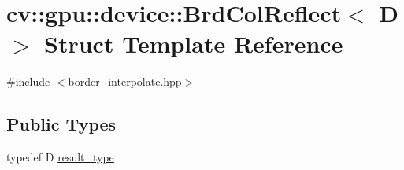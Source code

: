 \hypertarget{structcv_1_1gpu_1_1device_1_1BrdColReflect}{\section{cv\-:\-:gpu\-:\-:device\-:\-:Brd\-Col\-Reflect$<$ D $>$ Struct Template Reference}
\label{structcv_1_1gpu_1_1device_1_1BrdColReflect}
}


{\ttfamily \#include $<$border\-\_\-interpolate.\-hpp$>$}

\subsection*{Public Types}
\begin{DoxyCompactItemize}
\item 
typedef D \hyperlink{structcv_1_1gpu_1_1device_1_1BrdColReflect_af00d6bbdebcae365b6c9020375b99fe5}{result\-\_\-type}
\end{DoxyCompactItemize}
